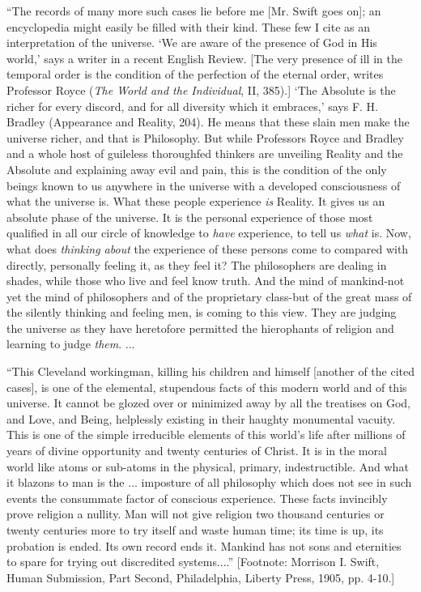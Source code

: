 \documentclass[]{article}
\begin{document}
``The records of many more such cases lie before me [Mr. Swift goes on];
an encyclopedia might easily be filled with their kind. These few I cite
as an interpretation of the universe. `We are aware of the presence of
God in His world,' says a writer in a recent English Review. [The very
presence of ill in the temporal order is the condition of the perfection
of the eternal order, writes Professor Royce (\emph{The World and the
Individual}, II, 385).] `The Absolute is the richer for every discord,
and for all diversity which it embraces,' says F. H. Bradley (Appearance
and Reality, 204). He means that these slain men make the universe
richer, and that is Philosophy. But while Professors Royce and Bradley
and a whole host of guileless thoroughfed thinkers are unveiling
Reality and the Absolute and explaining away evil and pain, this is the
condition of the only beings known to us anywhere in the universe with
a developed consciousness of what the universe is. What these people
experience \emph{is} Reality. It gives us an absolute phase of the universe. It
is the personal experience of those most qualified in all our circle
of knowledge to \emph{have} experience, to tell us \emph{what} is. Now, what does
\emph{thinking about} the experience of these persons come to compared with
directly, personally feeling it, as they feel it? The philosophers are
dealing in shades, while those who live and feel know truth. And the
mind of mankind-not yet the mind of philosophers and of the proprietary
class-but of the great mass of the silently thinking and feeling men,
is coming to this view. They are judging the universe as they have
heretofore permitted the hierophants of religion and learning to judge
\emph{them}. ...

``This Cleveland workingman, killing his children and himself [another
of the cited cases], is one of the elemental, stupendous facts of this
modern world and of this universe. It cannot be glozed over or minimized
away by all the treatises on God, and Love, and Being, helplessly
existing in their haughty monumental vacuity. This is one of the simple
irreducible elements of this world's life after millions of years of
divine opportunity and twenty centuries of Christ. It is in the moral
world like atoms or sub-atoms in the physical, primary, indestructible.
And what it blazons to man is the ... imposture of all philosophy
which does not see in such events the consummate factor of conscious
experience. These facts invincibly prove religion a nullity. Man will
not give religion two thousand centuries or twenty centuries more to try
itself and waste human time; its time is up, its probation is ended.
Its own record ends it. Mankind has not sons and eternities to spare for
trying out discredited systems....'' [Footnote: Morrison I. Swift, Human
Submission, Part Second, Philadelphia, Liberty Press, 1905, pp. 4-10.]
\end{document}
